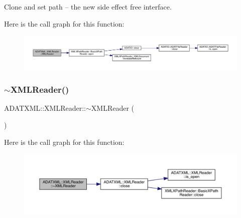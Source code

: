 Clone and set path -- the new side effect free interface. 

Here is the call graph for this function\+:
\nopagebreak
\begin{figure}[H]
\begin{center}
\leavevmode
\includegraphics[width=350pt]{db/d3f/classADATXML_1_1XMLReader_aef69d83a0f47db461436fc2fd3bb7723_cgraph}
\end{center}
\end{figure}
\mbox{\label{classADATXML_1_1XMLReader_a98c4936a3366f39443113290b7bd164a}} 
\subsubsection{\texorpdfstring{$\sim$XMLReader()}{~XMLReader()}\hspace{0.1cm}{\footnotesize\ttfamily [1/3]}}
{\footnotesize\ttfamily A\+D\+A\+T\+X\+M\+L\+::\+X\+M\+L\+Reader\+::$\sim$\+X\+M\+L\+Reader (\begin{DoxyParamCaption}{ }\end{DoxyParamCaption})\hspace{0.3cm}{\ttfamily [inline]}}

Here is the call graph for this function\+:
\nopagebreak
\begin{figure}[H]
\begin{center}
\leavevmode
\includegraphics[width=350pt]{db/d3f/classADATXML_1_1XMLReader_a98c4936a3366f39443113290b7bd164a_cgraph}
\end{center}
\end{figure}
\mbox{\label{classADATXML_1_1XMLReader_a1934189445871612ae9b93f35e17c468}} 
